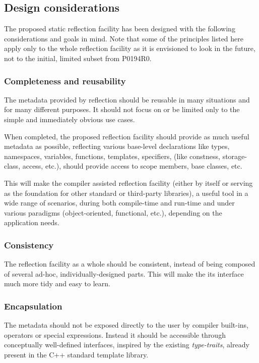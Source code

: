 \subsection{Design considerations}

The proposed static reflection facility has been designed with the following
considerations and goals in mind. 
Note that some of the principles listed here
apply only to the whole reflection facility as it is envisioned
to look in the future, not to the initial, limited subset from P0194R0.

\subsubsection{Completeness and reusability}
\label{design-completeness}

The metadata provided by reflection should be reusable in many situations
and for many different purposes.
It should not focus on or be limited only to the simple and immediately obvious
use cases.

When completed, the proposed reflection facility should provide as much useful
metadata as possible, reflecting various base-level
declarations like types, namespaces, variables, functions, templates, specifiers,
(like constness, storage-class, access, etc.), should provide access
to scope members, base classes, etc.

This will make the compiler assisted reflection facility (either by itself or serving
as the foundation for other standard or third-party libraries), a useful tool
in a wide range of scenarios, during both compile-time
and run-time and under various paradigms (object-oriented, functional, etc.),
depending on the application needs.

\subsubsection{Consistency}
\label{design-consistency}

The reflection facility as a whole should be consistent, instead of being
composed of several ad-hoc, individually-designed parts. This will make the
its interface much more tidy and easy to learn.

\subsubsection{Encapsulation}
\label{design-encapsulation}

The metadata should not be exposed directly
to the user by compiler built-ins, operators or special expressions.
Instead it should be accessible through conceptually well-defined interfaces,
inspired by the existing {\em type-traits}, already present in
the C++ standard template library.


